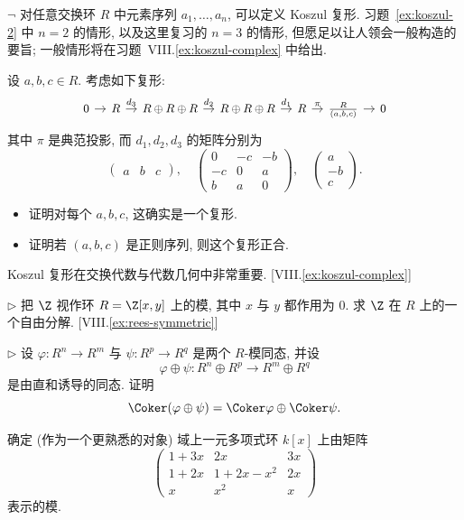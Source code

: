 \begin{prob}\label{ex:koszul-3}
$\neg$ 对任意交换环 $R$ 中元素序列 $a_1,\ldots,a_n$, 可以定义 Koszul 复形. 习题~\ref{ex:koszul-2} 中 $n=2$ 的情形, 以及这里复习的 $n=3$ 的情形, 但愿足以让人领会一般构造的要旨; 一般情形将在习题~VIII.\ref{ex:koszul-complex} 中给出.

设 $a,b,c\in R$. 考虑如下复形:
$$
\begin{tikzcd}[column sep=.9em,font=\small]
0 \ar[r] & R \ar[r,"d_3"] & R\oplus R\oplus R \ar[r,"d_2"] & R\oplus R\oplus R \ar[r,"d_1"] & R \ar[r,"\pi"] & \frac{R}{(a,b,c)} \ar[r] & 0
\end{tikzcd}
$$
其中 $\pi$ 是典范投影, 而 $d_1,d_2,d_3$ 的矩阵分别为
$$
\begin{pmatrix} a & b & c \end{pmatrix},\quad
\begin{pmatrix} 0 & -c & -b \\ -c & 0 & a \\ b & a & 0 \end{pmatrix},\quad
\begin{pmatrix} a \\ -b \\ c \end{pmatrix}.
$$

\begin{itemize}
\item 证明对每个 $a,b,c$, 这确实是一个复形.
\item 证明若 $(a,b,c)$ 是正则序列, 则这个复形正合.
\end{itemize}

Koszul 复形在交换代数与代数几何中非常重要. [VIII.\ref{ex:koszul-complex}]
\end{prob}

\begin{prob}\label{ex:free-res-Z}
$\triangleright$ 把 $\Z$ 视作环 $R=\Z[x,y]$ 上的模, 其中 $x$ 与 $y$ 都作用为 $0$. 求 $\Z$ 在 $R$ 上的一个自由分解. [VIII.\ref{ex:rees-symmetric}]
\end{prob}

\begin{prob}\label{ex:coker-direct-sum}
$\triangleright$ 设 $\varphi:R^n\to R^m$ 与 $\psi:R^p\to R^q$ 是两个 $R$-模同态, 并设
$$
\varphi\oplus\psi:R^n\oplus R^p \to R^m\oplus R^q
$$
是由直和诱导的同态. 证明
$$
\Coker(\varphi\oplus\psi)=\Coker\varphi\oplus\Coker\psi.
$$

\end{prob}

\begin{prob}\label{ex:read-matrix-kx}
确定 (作为一个更熟悉的对象) 域上一元多项式环 $k[x]$ 上由矩阵
$$
\begin{pmatrix} 1+3x & 2x & 3x \\ 1+2x & 1+2x-x^2 & 2x \\ x & x^2 & x \end{pmatrix}
$$
表示的模.
\end{prob}

